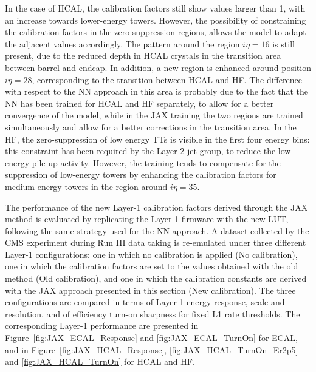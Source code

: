 In the case of HCAL, the calibration factors still show values larger than 1, with an increase towards lower-energy towers. However, the possibility of constraining the calibration factors in the zero-suppression regions, allows the model to adapt the adjacent values accordingly. The pattern around the region $i\eta=16$ is still present, due to the reduced depth in HCAL crystals in the transition area between barrel and endcap. In addition, a new region is enhanced around position $i\eta=28$, corresponding to the transition between HCAL and HF. The difference with respect to the NN approach in this area is probably due to the fact that the NN has been trained for HCAL and HF separately, to allow for a better convergence of the model, while in the JAX training the two regions are trained simultaneously and allow for a better corrections in the transition area.
In the HF, the zero-suppression of low energy TTs is visible in the first four energy bins: this constraint has been required by the Layer-2 jet group, to reduce the low-energy pile-up activity. However, the training tends to compensate for the suppression of low-energy towers by enhancing the calibration factors for medium-energy towers in the region around $i\eta=35$.

\bigbreak

The performance of the new Layer-1 calibration factors derived through the JAX method is evaluated by replicating the Layer-1 firmware with the new LUT, following the same strategy used for the NN approach. A dataset collected by the CMS experiment during Run III data taking is re-emulated under three different Layer-1 configurations: one in which no calibration is applied (No calibration), one in which the calibration factors are set to the values obtained with the old method (Old calibration), and one in which the calibration constants are derived with the JAX approach presented in this section (New calibration). 
The three configurations are compared in terms of Layer-1 energy response, scale and resolution, and of efficiency turn-on sharpness for fixed L1 rate thresholds. The corresponding Layer-1 performance are presented in Figure~\ref{fig:JAX_ECAL_Response} and \ref{fig:JAX_ECAL_TurnOn} for ECAL, and in Figure~\ref{fig:JAX_HCAL_Response}, \ref{fig:JAX_HCAL_TurnOn_Er2p5} and \ref{fig:JAX_HCAL_TurnOn} for HCAL and HF.

